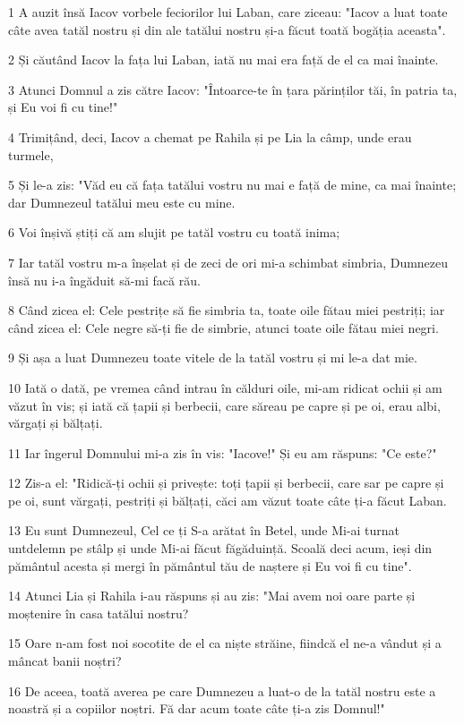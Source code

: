 \par 1 A auzit însă Iacov vorbele feciorilor lui Laban, care ziceau: "Iacov a luat toate câte avea tatăl nostru și din ale tatălui nostru și-a făcut toată bogăția aceasta".
\par 2 Și căutând Iacov la fața lui Laban, iată nu mai era față de el ca mai înainte.
\par 3 Atunci Domnul a zis către Iacov: "Întoarce-te în țara părinților tăi, în patria ta, și Eu voi fi cu tine!"
\par 4 Trimițând, deci, Iacov a chemat pe Rahila și pe Lia la câmp, unde erau turmele,
\par 5 Și le-a zis: "Văd eu că fața tatălui vostru nu mai e față de mine, ca mai înainte; dar Dumnezeul tatălui meu este cu mine.
\par 6 Voi înșivă știți că am slujit pe tatăl vostru cu toată inima;
\par 7 Iar tatăl vostru m-a înșelat și de zeci de ori mi-a schimbat simbria, Dumnezeu însă nu i-a îngăduit să-mi facă rău.
\par 8 Când zicea el: Cele pestrițe să fie simbria ta, toate oile fătau miei pestriți; iar când zicea el: Cele negre să-ți fie de simbrie, atunci toate oile fătau miei negri.
\par 9 Și așa a luat Dumnezeu toate vitele de la tatăl vostru și mi le-a dat mie.
\par 10 Iată o dată, pe vremea când intrau în călduri oile, mi-am ridicat ochii și am văzut în vis; și iată că țapii și berbecii, care săreau pe capre și pe oi, erau albi, vărgați și bălțați.
\par 11 Iar îngerul Domnului mi-a zis în vis: "Iacove!" Și eu am răspuns: "Ce este?"
\par 12 Zis-a el: "Ridică-ți ochii și privește: toți țapii și berbecii, care sar pe capre și pe oi, sunt vărgați, pestriți și bălțați, căci am văzut toate câte ți-a făcut Laban.
\par 13 Eu sunt Dumnezeul, Cel ce ți S-a arătat în Betel, unde Mi-ai turnat untdelemn pe stâlp și unde Mi-ai făcut făgăduință. Scoală deci acum, ieși din pământul acesta și mergi în pământul tău de naștere și Eu voi fi cu tine".
\par 14 Atunci Lia și Rahila i-au răspuns și au zis: "Mai avem noi oare parte și moștenire în casa tatălui nostru?
\par 15 Oare n-am fost noi socotite de el ca niște străine, fiindcă el ne-a vândut și a mâncat banii noștri?
\par 16 De aceea, toată averea pe care Dumnezeu a luat-o de la tatăl nostru este a noastră și a copiilor noștri. Fă dar acum toate câte ți-a zis Domnul!"
